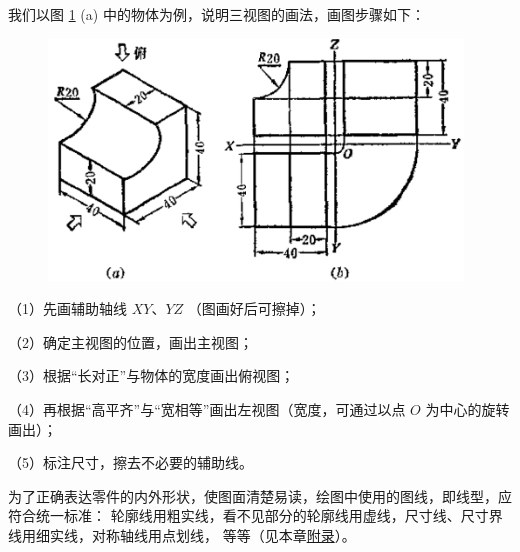我们以图 \ref{fig:czjh2-8-15} (a) 中的物体为例，说明三视图的画法，画图步骤如下：

\begin{figure}[htbp]
    \centering
    \includegraphics[width=11cm]{../pic/czjh2-ch8-15.png}
    \caption{}\label{fig:czjh2-8-15}
\end{figure}

（1）先画辅助轴线 $XY$、$YZ$ （图画好后可擦掉）；

（2）确定主视图的位置，画出主视图；

（3）根据“长对正”与物体的宽度画出俯视图；

（4）再根据“高平齐”与“宽相等”画出左视图（宽度，可通过以点 $O$ 为中心的旋转画出）；

（5）标注尺寸，擦去不必要的辅助线。

为了正确表达零件的内外形状，使图面清楚易读，绘图中使用的图线，即线型，应符合统一标准：
轮廓线用粗实线，看不见部分的轮廓线用虚线，尺寸线、尺寸界线用细实线，对称轴线用点划线，
等等（见本章\hyperref[sec:czjh2-8-fulu]{附录}）。


